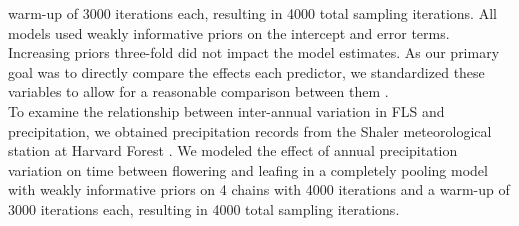 \documentclass{article}\usepackage[]{graphicx}\usepackage[]{color}
\begin{document}
warm-up of 3000 iterations each, resulting in 4000 total sampling iterations. All models used weakly informative priors on the intercept and error terms. Increasing priors three-fold did not impact the model estimates. As our primary goal was to directly compare the effects each predictor, we standardized these variables to allow for a reasonable comparison between them {\citep{Gelman2007}. \\

\noindent To examine the relationship between inter-annual variation in FLS and precipitation, we obtained precipitation records from the Shaler meteorological station at Harvard Forest \citep{Boose2004}. We modeled the effect of annual precipitation variation on time between flowering and leafing in a  completely pooling model with weakly informative priors on 4 chains with 4000 iterations and a warm-up of 3000 iterations each, resulting in 4000 total sampling iterations.\\

%
%
%
%

}
\end{document}
